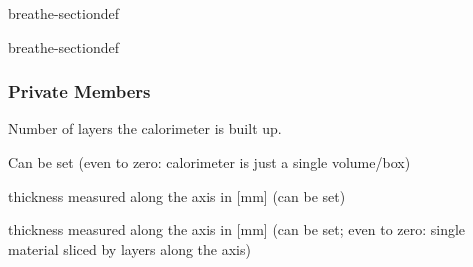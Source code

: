 \documentclass[letterpaper,10pt,english]{sphinxmanual}
\begin{document}
\begin{fulllineitems}
\begin{sphinxuseclass}{breathe-sectiondef}
\begin{fulllineitems}
\end{fulllineitems}


\end{sphinxuseclass}
\begin{sphinxuseclass}{breathe-sectiondef}\subsubsection*{Private Members}

\begin{fulllineitems}
\label{\detokenize{Simulation/SimulationCodeDoc:_CPPv4N8Geometry10fNumLayersE}}
\pysigstartsignatures
\pysigstartmultiline
{}
\pysigstopmultiline
\pysigstopsignatures
\sphinxAtStartPar
Number of layers the calorimeter is built up. 

\sphinxAtStartPar
Can be set (even to zero: calorimeter is just a single volume/box) 

\end{fulllineitems}


\begin{fulllineitems}
\label{\detokenize{Simulation/SimulationCodeDoc:_CPPv4N8Geometry9fAbsThickE}}
\pysigstartsignatures
\pysigstartmultiline
{}
\pysigstopmultiline
\pysigstopsignatures
\sphinxAtStartPar
{} thickness measured along the \sphinxhyphen{}axis in {[}mm{]} (can be set) 

\end{fulllineitems}


\begin{fulllineitems}
\label{\detokenize{Simulation/SimulationCodeDoc:_CPPv4N8Geometry9fGapThickE}}
\pysigstartsignatures
\pysigstartmultiline
{}
\pysigstopmultiline
\pysigstopsignatures
\sphinxAtStartPar
{} thickness measured along the \sphinxhyphen{}axis in {[}mm{]} (can be set; even to zero: single material  sliced by layers along the \sphinxhyphen{}axis) 


\end{fulllineitems}
\end{sphinxuseclass}
\end{fulllineitems}
\end{document}
